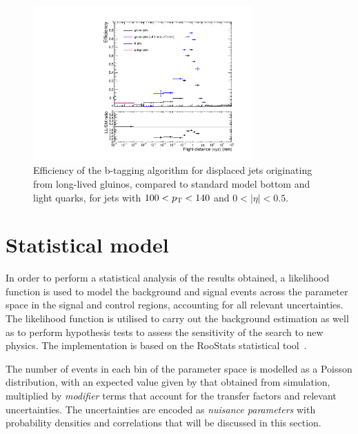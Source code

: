 \begin{figure}[h]
\includegraphics[width=0.75\textwidth]{figs/results/btageff_proper_compressed_pt100_eta0}
\caption{Efficiency of the b-tagging algorithm for displaced jets originating 
from long-lived gluinos, compared to standard model bottom and light quarks, 
for jets with $100 < {p_{\text T}} < 140$ and $0 < |\eta| < 0.5$.}
\label{fig:LL-btagging}
\end{figure}


\section{Statistical model}
\label{sec:results-likelihoodmodel}
In order to perform a statistical analysis of the results obtained, a 
likelihood function is used to model the background and signal events across 
the \njnbhtmht parameter space in the signal and control regions, accounting 
for all relevant uncertainties. The 
likelihood function is utilised to carry out the background estimation as well 
as to perform hypothesis tests to assess the sensitivity of the search to new 
physics. 
The implementation is based on the RooStats statistical tool~\cite{roostats}.

The number of events in each bin of the \njnbhtmht parameter space is modelled 
as a Poisson distribution, with an expected value given by that obtained from 
simulation, multiplied by \textit{modifier} terms that account for the transfer 
factors and relevant uncertainties. The uncertainties are encoded as 
\textit{nuisance parameters} with probability densities and correlations that 
will be discussed in this section.

